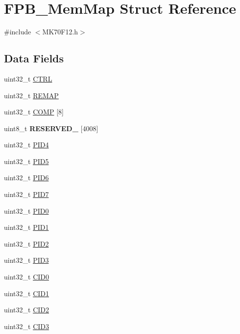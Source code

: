 \hypertarget{struct_f_p_b___mem_map}{}\section{F\+P\+B\+\_\+\+Mem\+Map Struct Reference}
\label{struct_f_p_b___mem_map}


{\ttfamily \#include $<$M\+K70\+F12.\+h$>$}

\subsection*{Data Fields}
\begin{DoxyCompactItemize}
\item 
uint32\+\_\+t \hyperlink{struct_f_p_b___mem_map_a121a2d8da37c6ebf48cb82cedc2c2be7}{C\+T\+R\+L}
\item 
uint32\+\_\+t \hyperlink{struct_f_p_b___mem_map_acdaa312f2de037db4f203b9cfd303772}{R\+E\+M\+A\+P}
\item 
uint32\+\_\+t \hyperlink{struct_f_p_b___mem_map_a09cb7f6616d521163b4cc6cf0dbd86b3}{C\+O\+M\+P} \mbox{[}8\mbox{]}
\item 
\hypertarget{struct_f_p_b___mem_map_ab88cbaf3b62c02e8c8866109dbf3393c}{}uint8\+\_\+t {\bfseries R\+E\+S\+E\+R\+V\+E\+D\+\_} \mbox{[}4008\mbox{]}\label{struct_f_p_b___mem_map_ab88cbaf3b62c02e8c8866109dbf3393c}

\item 
uint32\+\_\+t \hyperlink{struct_f_p_b___mem_map_a4c24f21441de38f5d96099cf78723401}{P\+I\+D4}
\item 
uint32\+\_\+t \hyperlink{struct_f_p_b___mem_map_a695321526b4704fe0e93fe59e4c88cce}{P\+I\+D5}
\item 
uint32\+\_\+t \hyperlink{struct_f_p_b___mem_map_a0b39a99cbc5776452682f777ac30b44e}{P\+I\+D6}
\item 
uint32\+\_\+t \hyperlink{struct_f_p_b___mem_map_afa51ab59e5a495de076915024e3e6adf}{P\+I\+D7}
\item 
uint32\+\_\+t \hyperlink{struct_f_p_b___mem_map_aa60cb9ab44ceaaee9f7487d64144c1d8}{P\+I\+D0}
\item 
uint32\+\_\+t \hyperlink{struct_f_p_b___mem_map_a4973e107a9b956437a6e62fb154c1295}{P\+I\+D1}
\item 
uint32\+\_\+t \hyperlink{struct_f_p_b___mem_map_a1a53923b7f5f3565b3c23fcfacc76232}{P\+I\+D2}
\item 
uint32\+\_\+t \hyperlink{struct_f_p_b___mem_map_a50469498a2399ab61bfa9c1826a1932a}{P\+I\+D3}
\item 
uint32\+\_\+t \hyperlink{struct_f_p_b___mem_map_ad9aa53125967afe84ec6267d3b147be9}{C\+I\+D0}
\item 
uint32\+\_\+t \hyperlink{struct_f_p_b___mem_map_a252a9bf3bd58aa080c9058f8acbc9dd0}{C\+I\+D1}
\item 
uint32\+\_\+t \hyperlink{struct_f_p_b___mem_map_a682979a59af5457d6c388fb11274fd9a}{C\+I\+D2}
\item 
uint32\+\_\+t \hyperlink{struct_f_p_b___mem_map_a75c3b9a038df70053d980c6ee3d2d821}{C\+I\+D3}
\end{DoxyCompactItemize}


